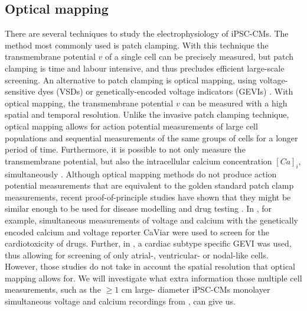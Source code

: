 \documentclass[12pt,a4paper]{article}
\begin{document}
\subsection{Optical mapping}
There are several techniques to study the electrophysiology of iPSC-CMs. The method most commonly used is patch clamping. With this technique the transmembrane potential $v$ of a single cell can be precisely measured, but patch clamping is time and labour intensive, and thus precludes efficient large-scale screening. An alternative to patch clamping is optical mapping, using voltage-sensitive dyes (VSDs) or genetically-encoded voltage indicators (GEVIs) \cite{Denning2016}. With optical mapping, the transmembrane potential $v$ can be measured with a high spatial and temporal resolution. Unlike the invasive patch clamping technique, optical mapping allows for action potential measurements of large cell populations and sequential measurements of the same groups of cells for a longer period of time. Furthermore, it is possible to not only measure the transmembrane potential, but also the intracellular calcium concentration $[Ca]_i$, simultaneously \cite{Lee2012}. 
Although optical mapping methods do not produce action potential measurements that are equivalent to the golden standard patch clamp measurements, recent proof-of-principle studies have shown that they might be similar enough to be used for disease modelling and drug testing \cite{Shukla2017}. In \cite{Dempsey2016}, for example, simultaneous measurements of voltage and calcium with the genetically encoded calcium and voltage reporter CaViar were used to screen for the cardiotoxicity of drugs. Further, in \cite{Chen2016},
a cardiac subtype specific GEVI was used, thus allowing for screening of only atrial-, ventricular- or nodal-like cells. However, those studies do not take in account the spatial resolution that optical mapping allows for. We will investigate what extra information those multiple cell measurements, such as the $\ge1$ cm large- diameter iPSC-CMs monolayer simultaneous voltage and calcium recordings from \cite{Lee2012}, can give us.
%
\end{document}
